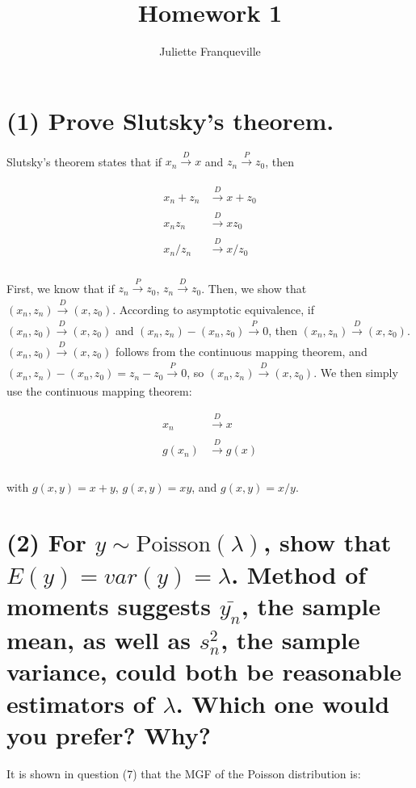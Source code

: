 \documentclass[11pt]{article}
\begin{document}
 
\title{Homework 1}
\author{Juliette Franqueville\\
}
\maketitle

\section*{(1) Prove Slutsky's theorem.}

Slutsky's theorem states that if $x_n \xrightarrow[]{D} x$ and $z_n \xrightarrow[]{P} z_0$, then 

\begin{align*}
    x_n +z_n &\xrightarrow[]{D} x+z_0\\
    x_n z_n &\xrightarrow[]{D} xz_0\\
    x_n / z_n &\xrightarrow[]{D} x/z_0\\
\end{align*}

First, we know that if $z_n \xrightarrow[]{P} z_0$, $z_n \xrightarrow[]{D} z_0$. Then, we show that $(x_n, z_n)\xrightarrow[]{D} (x, z_0)$.  According to asymptotic equivalence, if $(x_n, z_0) \xrightarrow[]{D} (x, z_0)$ and $(x_n, z_n) - (x_n, z_0) \xrightarrow[]{P} 0$, then $(x_n, z_n) \xrightarrow[]{D} (x, z_0)$.  $(x_n, z_0) \xrightarrow[]{D} (x, z_0)$  follows from the continuous mapping theorem, and $(x_n, z_n) - (x_n, z_0) = z_n - z_0 \xrightarrow[]{P} 0$, so  $(x_n, z_n) \xrightarrow[]{D} (x, z_0)$. We then simply use the continuous mapping theorem:

\begin{align*}
    x_n & \xrightarrow[]{D} x \\ 
    g(x_n) & \xrightarrow[]{D} g(x) \\ 
\end{align*}

with $g(x,y) = x+y$,  $g(x,y) = xy$, and $g(x,y) = x/y$.


\section*{(2) For $y \sim \text{Poisson}(\lambda)$, show that $E(y) = var(y) = \lambda$. Method of moments suggests $\bar{y_n}$, the sample mean, as well as $s^2_n$, the sample variance, could both be reasonable estimators of $\lambda$. Which one would you prefer? Why?}

It is shown in question (7) that the MGF of the Poisson distribution is:
\end{document}
